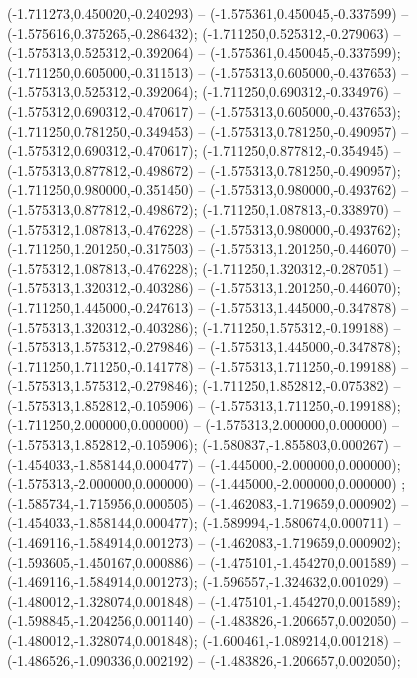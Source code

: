  (-1.711273,0.450020,-0.240293) -- (-1.575361,0.450045,-0.337599) -- (-1.575616,0.375265,-0.286432);
 (-1.711250,0.525312,-0.279063) -- (-1.575313,0.525312,-0.392064) -- (-1.575361,0.450045,-0.337599);
 (-1.711250,0.605000,-0.311513) -- (-1.575313,0.605000,-0.437653) -- (-1.575313,0.525312,-0.392064);
 (-1.711250,0.690312,-0.334976) -- (-1.575312,0.690312,-0.470617) -- (-1.575313,0.605000,-0.437653);
 (-1.711250,0.781250,-0.349453) -- (-1.575313,0.781250,-0.490957) -- (-1.575312,0.690312,-0.470617);
 (-1.711250,0.877812,-0.354945) -- (-1.575313,0.877812,-0.498672) -- (-1.575313,0.781250,-0.490957);
 (-1.711250,0.980000,-0.351450) -- (-1.575313,0.980000,-0.493762) -- (-1.575313,0.877812,-0.498672);
 (-1.711250,1.087813,-0.338970) -- (-1.575312,1.087813,-0.476228) -- (-1.575313,0.980000,-0.493762);
 (-1.711250,1.201250,-0.317503) -- (-1.575313,1.201250,-0.446070) -- (-1.575312,1.087813,-0.476228);
 (-1.711250,1.320312,-0.287051) -- (-1.575313,1.320312,-0.403286) -- (-1.575313,1.201250,-0.446070);
 (-1.711250,1.445000,-0.247613) -- (-1.575313,1.445000,-0.347878) -- (-1.575313,1.320312,-0.403286);
 (-1.711250,1.575312,-0.199188) -- (-1.575313,1.575312,-0.279846) -- (-1.575313,1.445000,-0.347878);
 (-1.711250,1.711250,-0.141778) -- (-1.575313,1.711250,-0.199188) -- (-1.575313,1.575312,-0.279846);
 (-1.711250,1.852812,-0.075382) -- (-1.575313,1.852812,-0.105906) -- (-1.575313,1.711250,-0.199188);
 (-1.711250,2.000000,0.000000) -- (-1.575313,2.000000,0.000000) -- (-1.575313,1.852812,-0.105906);
 (-1.580837,-1.855803,0.000267) -- (-1.454033,-1.858144,0.000477) -- (-1.445000,-2.000000,0.000000);
 (-1.575313,-2.000000,0.000000) -- (-1.445000,-2.000000,0.000000) ;
 (-1.585734,-1.715956,0.000505) -- (-1.462083,-1.719659,0.000902) -- (-1.454033,-1.858144,0.000477);
 (-1.589994,-1.580674,0.000711) -- (-1.469116,-1.584914,0.001273) -- (-1.462083,-1.719659,0.000902);
 (-1.593605,-1.450167,0.000886) -- (-1.475101,-1.454270,0.001589) -- (-1.469116,-1.584914,0.001273);
 (-1.596557,-1.324632,0.001029) -- (-1.480012,-1.328074,0.001848) -- (-1.475101,-1.454270,0.001589);
 (-1.598845,-1.204256,0.001140) -- (-1.483826,-1.206657,0.002050) -- (-1.480012,-1.328074,0.001848);
 (-1.600461,-1.089214,0.001218) -- (-1.486526,-1.090336,0.002192) -- (-1.483826,-1.206657,0.002050);
